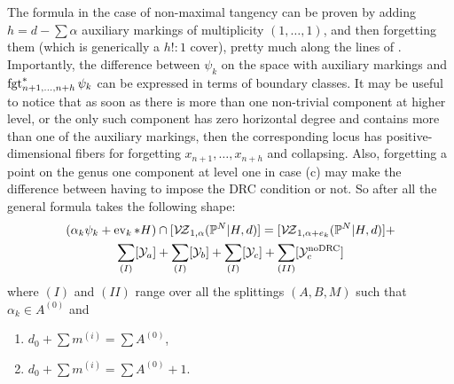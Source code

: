 The formula in the case of non-maximal tangency can be proven by adding $h=d-\sum\alpha$ auxiliary markings of multiplicity $(1,\ldots,1)$, and then forgetting them (which is generically a $h!\colon 1$ cover), pretty much along the lines of \cite[Corollary 3.5]{Ga}. Importantly, the difference between $\psi_k$ on the space with auxiliary markings and $\operatorname{fgt}_{n+1,\ldots,n+h}^*\psi_k$ can be expressed in terms of boundary classes. It may be useful to notice that as soon as there is more than one non-trivial component at higher level, or the only such component has zero horizontal degree and contains more than one of the auxiliary markings, then the corresponding locus has positive-dimensional fibers for forgetting $x_{n+1},\ldots,x_{n+h}$ and collapsing. Also, forgetting a point on the genus one component at level one in case (c) may make the difference between having to impose the DRC condition or not. So after all the general formula takes the following shape:
\begin{multline*}(\alpha_k\psi_k+\operatorname{ev}_k*H)\cap[\mathcal{V\!Z}_{1,\alpha}(\mathbb P^N|H,d)]=[\mathcal{V\!Z}_{1,\alpha+e_k}(\mathbb P^N|H,d)]+\\ \sum_{(I)}[\mathcal Y_a]+\sum_{(I)}[\mathcal Y_b]+\sum_{(I)}[\mathcal Y_c]+\sum_{(II)}[\mathcal Y_c^{\rm{no DRC}}]\end{multline*}
where $(I)$ and $(II)$ range over all the splittings $(A,B,M)$ such that $\alpha_k\in A^{(0)}$ and
\begin{enumerate}[label=(\Roman*)]
 \item $d_0+\sum m^{(i)}=\sum A^{(0)}$,
 \item $d_0+\sum m^{(i)}=\sum A^{(0)}+1$.
\end{enumerate}

